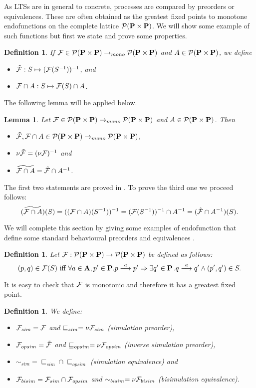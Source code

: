 \documentclass[submission]{eptcs}
\newcommand{\sqlt}{\sqsubseteq}
\newcommand{\der}[1]{\ensuremath{\stackrel{#1}{\longrightarrow}}}
\newcommand{\fun}{\rightarrow}
\newcommand{\Act}{{\bf A}}
\newcommand{\Proc}{{\bf P}}
\newcommand{\F}{{\cal F}}
\newcommand{\Po}{{\cal P}}
\newtheorem{lemma}[theorem]{Lemma}
\newtheorem{definition}[theorem]{Definition}
\newenvironment{proof}[1][Proof]{\begin{trivlist}
\item[\hskip \labelsep {\bfseries #1}]}{\end{trivlist}}
\begin{document}
As LTSs are in general to concrete, processes are compared by
preorders or equivalences. These are often obtained as the greatest
fixed points to monotone endofunctions on the complete lattice
$\Po(\Proc \times \Proc)$. We will show some example of such functions
but first we state and  prove some properties.
\begin{definition}
  If $\F\in\Po(\Proc \times \Proc)\fun_{mono}\Po(\Proc \times \Proc)$
  and $A\in\Po(\Proc \times \Proc)$, we define
\begin{itemize}
\item
$\tilde{\F}:S \mapsto (\F(S^{-1}))^{-1}$, and 
\item
$\F\cap A: S\mapsto\F(S)\cap A$.
\end{itemize}
\end{definition}
The following lemma  will be applied below.
\begin{lemma} \label{L:inverse} Let $\F\in\Po(\Proc \times
  \Proc)\fun_{mono}\Po(\Proc \times \Proc)$ and $A\in\Po(\Proc \times
  \Proc)$.  Then 
\begin{itemize}
\item
$\tilde{\F},\F\cap A\in\Po(\Proc \times
  \Proc)\fun_{mono}\Po(\Proc \times \Proc)$,
\item
$\nu \tilde{\F}=(\nu\F)^{-1}$ and
\item $\widetilde{\F\cap A}=\tilde{\F}\cap A^{-1}$.
\end{itemize}
\end{lemma}
\begin{proof}
  The first two statements are proved in \cite{AILS2011}. To prove the third
  one we proceed follows:
\[
(\widetilde{\F\cap A})(S)=((\F\cap A)(S^{-1}))^{-1}=(\F(S^{-1}))^{-1}\cap A^{-1}=(\tilde{\F}\cap A^{-1})(S).
\]
\end{proof}
We will complete this section by giving some examples of endofunction that
define some standard behavioural preorders and equivalences
\cite{vG2001,AILS2007}.
\begin{definition}
  Let $\F:\Po(\Proc \times \Proc)\fun \Po(\Proc \times \Proc)$ be
  defined as follows: 
\[
(p,q)\in\F(S)\mbox{ iff }\forall
a\in\Act,p'\in\Proc. p\der{a}p'\Rightarrow \exists q'\in\Proc
\,.q\der{a}q'\land(p',q')\in S.
\]
\end{definition}
It is easy to check that $\F$ is monotonic and therefore it has a
greatest fixed point.
\begin{definition}
We define:
\begin{itemize}
\item $\F_{sim}=\F$ and $\sqlt_{sim}=\nu\F_{sim}$ (simulation
  preorder),
\item $\F_{opsim}=\tilde{\F}$ and $\sqlt_{opsim}=\nu\F_{opsim}$ (inverse
  simulation preorder),
\item $\sim_{sim}=\sqlt_{sim}\cap \sqlt_{opsim}$ (simulation equivalence) and
\item $\F_{bisim}=\F_{sim}\cap\F_{opsim}$ and
  $\sim_{bisim}=\nu\F_{bisim}$ (bisimulation equivalence).
\end{itemize}
\end{definition}
\end{document}
